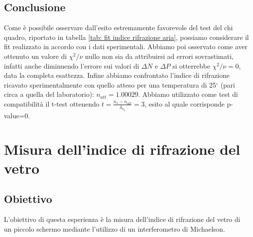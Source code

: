 \documentclass[a4paper]{article}
\begin{document}
\subsection{Conclusione}
Come è possibile osservare dall'esito estremamente favorevole del test del chi quadro, riportato in tabella \ref{tab: fit indice rifrazione aria}, possiamo considerare il fit realizzato in accordo con i dati sperimentali. Abbiamo poi osservato come aver ottenuto un valore di $\chi^2/\nu$ nullo non sia da attribuirsi ad errori sovrastimati, infatti anche diminuendo l'errore sui valori di $\Delta N$ e $\Delta P$ si otterrebbe $\chi^2/\nu= 0$, data la completa esattezza. Infine abbiamo confrontato l'indice di rifrazione ricavato sperimentalmente con quello atteso per una temperatura di 25$^\circ$ (pari circa a quella del laboratorio): $n_{att} =1.00029$. Abbiamo utilizzato come test di compatibilità il t-test ottenendo $t= \frac{n_s-n_{att}}{\delta_{n_s}}=3$, esito al quale corrisponde p-value=0. 

\section{Misura dell'indice di rifrazione del vetro}
\subsection{Obiettivo}
L'obiettivo di questa esperienza è la misura dell'indice di rifrazione del vetro di un  piccolo schermo mediante l'utilizzo di un interferometro di Michaelson.
\end{document}
